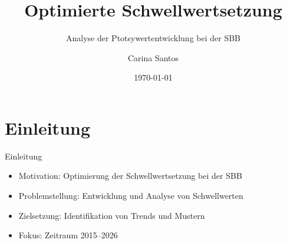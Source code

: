 \documentclass{beamer}
\title{Optimierte Schwellwertsetzung}
\subtitle{Analyse der Ptotsywertentwicklung bei der SBB}
\author{Carina Santos}
\date{\today}
\begin{document}
\begin{frame}[plain]
  \titlepage
\end{frame}


\section{Einleitung}

\begin{frame}{Einleitung}
  \begin{itemize}
    \item Motivation: Optimierung der Schwellwertsetzung bei der SBB
    \vspace{0.5cm}
    \item Problemstellung: Entwicklung und Analyse von Schwellwerten
    \vspace{0.5cm}
    \item Zielsetzung: Identifikation von Trends und Mustern
    \vspace{0.5cm}
    \item Fokus: Zeitraum 2015–2026
  \end{itemize}
\end{frame}


\end{document}
